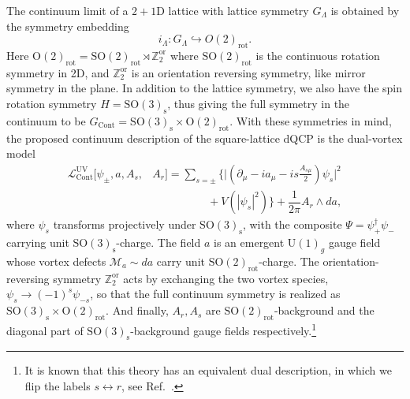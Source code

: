 \documentclass[aps,prx,reprint,superscriptaddress,twocolumn,amsmath,amssymb,amsfonts, nofootinbib]{revtex4-2}
\newcommand{\SO}{\text{SO}}
\newcommand{\Z}{\mathbb{Z}}
\theoremstyle{apsstyle}
\begin{document}
The continuum limit of a $2+1$D lattice with lattice symmetry $G_{\Lambda}$ is obtained by the symmetry embedding 
\begin{equation*}
    i_{\Lambda}: G_{\Lambda} \hookrightarrow O(2)_{\mathrm{rot}}.
\end{equation*}
Here $\mathrm{O}(2)_{\mathrm{rot}}=\SO(2)_{\mathrm{rot}}\rtimes \Z_{2}^{\mathrm{or}}$ where $\SO(2)_{\mathrm{rot}}$ is the continuous rotation symmetry in 2D, and $\Z_{2}^{\mathrm{or}}$ is an orientation reversing symmetry, like mirror symmetry in the plane. In addition to the lattice symmetry, we also have the spin rotation symmetry $H=\SO(3)_{\mathrm{s}}$, thus giving the full symmetry in the continuum to be $G_{\mathrm{Cont}}=\SO(3)_{\mathrm{s}}\times \mathrm{O}(2)_{\mathrm{rot}}$. With these symmetries in mind, the proposed continuum description of the square-lattice dQCP is the dual-vortex model~\cite{SenthilBTI, Senthil_dqcp_prb, ScienceSenthil}
\begin{align}
    \mathcal{L}_{\mathrm{Cont}}^{\mathrm{UV}}[\psi_{\pm}, a, A_{s}, &A_{r}]= \sum_{s=\pm}\bigg\{\biggr\rvert \left(\partial_{\mu}-ia_{\mu}-is \frac{A_{s\mu}}{2}\right) \psi_{s} \biggr\rvert^{2} \nonumber \\
    &\qquad \qquad \quad  + V(|\psi_{s}|^{2})\bigg\}
  +\dfrac{1}{2\pi} A_{r} \wedge da,
  \label{eq:dual_vortex}
\end{align}
where $\psi_{s}$ transforms projectively under $\SO(3)_{\mathrm{s}}$, with the composite $\Psi= \psi^{\dagger}_{+}\psi_{-}$ carrying unit $\SO(3)_{\mathrm{s}}$-charge. The field $a$ is an emergent $\mathrm{U}(1)_{g}$ gauge field whose vortex defects $\mathcal{M}_{a}\sim da$ carry unit $\SO(2)_{\mathrm{rot}}$-charge.  The orientation-reversing symmetry $\mathbb Z_{2}^{\mathrm{or}}$ acts by exchanging the two vortex species, $\psi_{s}\rightarrow (-1)^{s}\psi_{-s}$, so that the full continuum symmetry is realized as $\mathrm{SO}(3)_{\mathrm{s}}\times \mathrm{O}(2)_{\mathrm{rot}}$. And finally, $A_{r}, A_{s}$ are $\SO(2)_{\mathrm{rot}}$-background and the diagonal part of $\SO(3)_{\mathrm{s}}$-background gauge fields respectively.\footnote{It is known that this theory has an equivalent dual description, in which we flip the labels $s \leftrightarrow r$, see Ref.~\cite{ChongWang_dqcp}.} 
\end{document}
